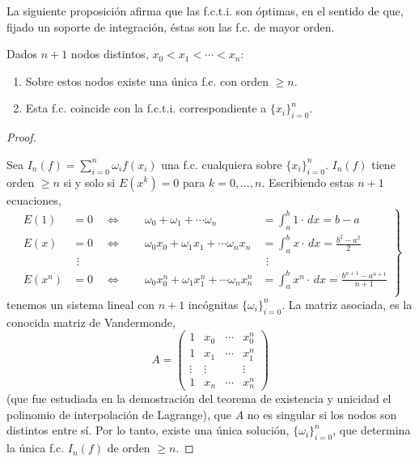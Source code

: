 La siguiente proposición afirma que las f.c.t.i. son óptimas, en el
sentido de que, fijado un soporte de integración, éstas son las f.c.
de mayor orden.
\begin{proposition}
  \label{pro:existencia.fcti}
  Dados $n+1$ nodos distintos, $x_0<x_1<\cdots<x_n$:
  \begin{enumerate}
  \item Sobre estos nodos existe una única f.c. con orden $\ge
    n$.
  \item Esta f.c. coincide con la f.c.t.i. correspondiente a
    $\{x_i\}_{i=0}^n$.
  \end{enumerate}
\end{proposition}
\begin{proof}~\par
   Sea $I_n(f)=\sum_{i=0}^n \omega_i f(x_i)$ una
  f.c. cualquiera sobre $\{x_i\}_{i=0}^n$. $I_n(f)$ tiene orden $\ge
  n$ si y solo si $E(x^k)=0$ para $k=0,\dots,n$. Escribiendo estas $n+1$
  ecuaciones,
  \begin{equation}
    \left.
  \begin{alignedat}{2} %
    E(1)&=0 \quad \Leftrightarrow\ \quad &
    \omega_0 + \omega_1 + \cdots \omega_n &=
    \int_a^b 1\cdot\,dx = b-a
    \\
    E(x)&=0 \quad \Leftrightarrow\ \quad &
    \omega_0 x_0 + \omega_1 x_1 + \cdots \omega_n x_n &=
    \int_a^b x \cdot\,dx = \frac{b^2-a^2}{2}
    \\
    &\ \, \vdots & &\ \, \vdots
    \\
    E(x^n)&=0 \quad \Leftrightarrow\ \quad &
    \omega_0 x_0^n + \omega_1 x_1^n + \cdots \omega_n x_n^n &=
    \int_a^b x^n \cdot\,dx = \frac{b^{n+1}-a^{n+1}}{n+1}
    \\
  \end{alignedat}
  \right\}
  \label{eq:sl.fcti}
\end{equation}
  tenemos un sistema lineal con $n+1$ incógnitas
  $\{\omega_i\}_{i=0}^n$. La matriz asociada, es la conocida matriz de
  Vandermonde,
  \begin{equation*}
    A =
    \begin{pmatrix}
      1 & x_0& \cdots & x_0^n \\
      1 & x_1& \cdots & x_1^n \\
      \vdots & \vdots & & \vdots \\
      1 & x_n& \cdots & x_n^n
    \end{pmatrix}
  \end{equation*}
  (que fue estudiada en la demostración del teorema de existencia y
  unicidad el polinomio de interpolación de Lagrange), que $A$ no es
  singular si los nodos son distintos entre sí.  Por lo tanto, existe
  una única solución, $\{\omega_i\}_{i=0}^n$, que determina la única
  f.c. $I_n(f)$ de orden $\ge n$.


\end{proof}
